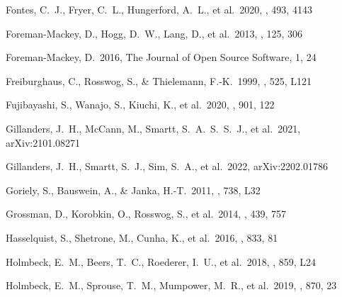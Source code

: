 \documentclass[twocolumn, twocolappendix]{aastex63}
\begin{document}
\begin{thebibliography}{}
 Fontes, C.~J., Fryer, C.~L., Hungerford, A.~L., et al.\ 2020, \mnras, 493, 4143


  Foreman-Mackey, D., Hogg, D.~W., Lang, D., et al.\ 2013, \pasp, 125, 306


 Foreman-Mackey, D.\ 2016, The Journal of Open Source Software, 1, 24







 
 Freiburghaus, C., Rosswog, S., \& Thielemann, F.-K.\ 1999, \apjl, 525, L121


 Fujibayashi, S., Wanajo, S., Kiuchi, K., et al.\ 2020, \apj, 901, 122


 Gillanders, J.~H., McCann, M., Smartt, S.~A.~S.~S.~J., et al.\ 2021, arXiv:2101.08271


 Gillanders, J.~H., Smartt, S.~J., Sim, S.~A., et al.\ 2022, arXiv:2202.01786




 Goriely, S., Bauswein, A., \& Janka, H.-T.\ 2011, \apjl, 738, L32


 Grossman, D., Korobkin, O., Rosswog, S., et al.\ 2014, \mnras, 439, 757


 Hasselquist, S., Shetrone, M., Cunha, K., et al.\ 2016, \apj, 833, 81


 Holmbeck, E.~M., Beers, T.~C., Roederer, I.~U., et al.\ 2018, \apjl, 859, L24


 Holmbeck, E.~M., Sprouse, T.~M., Mumpower, M.~R., et al.\ 2019, \apj, 870, 23



\end{thebibliography}
\end{document}
